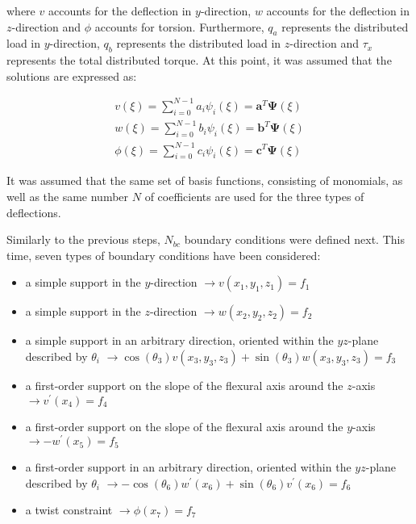 \noindent where $v$ accounts for the deflection in $y$-direction, $w$ accounts for the deflection in $z$-direction and $\phi$ accounts for torsion. Furthermore, $q_a$ represents the distributed load in $y$-direction, $q_b$ represents the distributed load in $z$-direction and $\tau_x$ represents the total distributed torque. At this point, it was assumed that the solutions are expressed as:

\begin{equation}
    \begin{array}{l}
{v(\xi)=\sum_{i=0}^{N-1} a_{i} \psi_{i}(\xi)=\mathbf{a}^{T} \mathbf{\Psi}(\xi)} \\
{w(\xi)=\sum_{i=0}^{N-1} b_{i} \psi_{i}(\xi)=\mathbf{b}^{T} \mathbf{\Psi}(\xi)} \\
{\phi(\xi)=\sum_{i=0}^{N-1} c_{i} \psi_{i}(\xi)=\mathbf{c}^{T} \mathbf{\Psi}(\xi)}
\end{array}
\end{equation}

\noindent It was assumed that the same set of basis functions, consisting of monomials, as well as the same number $N$ of coefficients are used for the three types of deflections.

\noindent Similarly to the previous steps, $N_{bc}$ boundary conditions were defined next. This time, seven types of boundary conditions have been considered:
\begin{itemize}
    \item a simple support in the $y$-direction $\rightarrow v\left(x_{1}, y_{1}, z_{1}\right)=f_{1}$
    \item a simple support in the $z$-direction $\rightarrow w\left(x_{2}, y_{2}, z_{2}\right)=f_{2}$
    \item a simple support in an arbitrary direction, oriented within the $yz$-plane described by $\theta_i$ $\rightarrow \cos \left(\theta_{3}\right) v\left(x_{3}, y_{3}, z_{3}\right)+\sin \left(\theta_{3}\right) w\left(x_{3}, y_{3}, z_{3}\right)=f_{3}$
    \item a first-order support on the slope of the flexural axis around the $z$-axis $\rightarrow v^{\prime}\left(x_{4}\right)=f_{4}$
    \item a first-order support on the slope of the flexural axis around the $y$-axis $\rightarrow -w^{\prime}\left(x_{5}\right)=f_{5}$
    \item a first-order support in an arbitrary direction, oriented within the $yz$-plane described by $\theta_i$ $\rightarrow -\cos \left(\theta_{6}\right) w^{\prime}\left(x_{6}\right)+\sin \left(\theta_{6}\right) v^{\prime}\left(x_{6}\right)=f_{6}$
    \item a twist constraint $\rightarrow \phi\left(x_{7}\right)=f_{7}$
    
\end{itemize}

